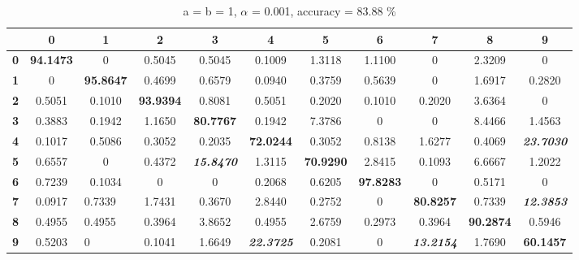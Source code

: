 \documentclass[twoside]{article}
\begin{document}
\begin{table}[h]
	\begin{center}
	\begin{tabular}{|c|c|c|c|c|c|c|c|c|c|c|}
		\hline
		\multicolumn{1}{|l|}{} & \multicolumn{1}{c|}{\textbf{0}} & \multicolumn{1}{c|}{\textbf{1}} & \multicolumn{1}{c|}{\textbf{2}} & \multicolumn{1}{c|}{\textbf{3}} & \multicolumn{1}{c|}{\textbf{4}} & \multicolumn{1}{c|}{\textbf{5}} & \multicolumn{1}{c|}{\textbf{6}} & \multicolumn{1}{c|}{\textbf{7}} & \multicolumn{1}{c|}{\textbf{8}} & \multicolumn{1}{c|}{\textbf{9}} \\ \hline
		\textbf{0} & \textbf{94.1473} & 0 & 0.5045 & 0.5045 & 0.1009 & 1.3118 & 1.1100 & 0 & 2.3209 & 0 \\ \hline
		\textbf{1} & 0 & \textbf{95.8647} & 0.4699 & 0.6579 & 0.0940 & 0.3759 & 0.5639 & 0 & 1.6917 & 0.2820 \\ \hline
		\textbf{2} & 0.5051 & 0.1010 & \textbf{93.9394} & 0.8081 & 0.5051 & 0.2020 & 0.1010 & 0.2020 & 3.6364 & 0 \\ \hline
		\textbf{3} & 0.3883 & 0.1942 & 1.1650 & \textbf{80.7767} & 0.1942 & 7.3786 & 0 & 0 & 8.4466 & 1.4563 \\ \hline
		\textbf{4} & 0.1017 & 0.5086 & 0.3052 & 0.2035 & \textbf{72.0244} & 0.3052 & 0.8138 & 1.6277 & 0.4069 & \textit{\textbf{23.7030}} \\ \hline
		\textbf{5} & 0.6557 & 0 & 0.4372 & \textit{\textbf{15.8470}} & 1.3115 & \textbf{70.9290} & 2.8415 & 0.1093 & 6.6667 & 1.2022 \\ \hline
		\textbf{6} & 0.7239 & 0.1034 & 0 & 0 & 0.2068 & 0.6205 & \textbf{97.8283} & 0 & 0.5171 & 0 \\ \hline
		\textbf{7} & 0.0917 & \multicolumn{1}{l|}{0.7339} & 1.7431 & 0.3670 & 2.8440 & 0.2752 & 0 & \textbf{80.8257} & 0.7339 & \textit{\textbf{12.3853}} \\ \hline
		\textbf{8} & 0.4955 & \multicolumn{1}{l|}{0.4955} & 0.3964 & 3.8652 & 0.4955 & 2.6759 & 0.2973 & 0.3964 & \textbf{90.2874} & 0.5946 \\ \hline
		\textbf{9} & 0.5203 & \multicolumn{1}{l|}{0} & 0.1041 & 1.6649 & \textit{\textbf{22.3725}} & 0.2081 & 0 & \textit{\textbf{13.2154}} & 1.7690 & \textbf{60.1457} \\ \hline
	\end{tabular}
	\label{table:1}
	\caption{a = b = 1, $\alpha$ = 0.001, accuracy = 83.88 \%}
	\end{center}	
\end{table}
\end{document}
